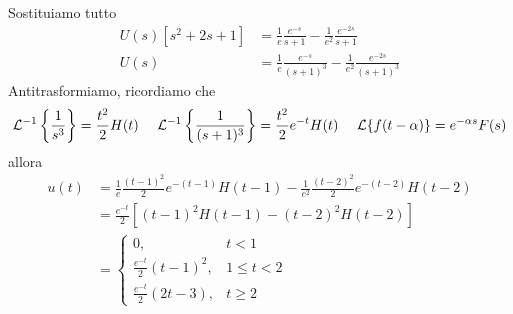 Sostituiamo tutto
\begin{equation*}
\begin{aligned}
U( s)\left[ s^{2} +2s+1\right] & =\frac{1}{e}\frac{e^{-s}}{s+1} -\frac{1}{e^{2}}\frac{e^{-2s}}{s+1}\\
U( s) & =\frac{1}{e}\frac{e^{-s}}{( s+1)^{3}} -\frac{1}{e^{2}}\frac{e^{-2s}}{( s+1)^{3}}
\end{aligned}
\end{equation*}
Antitrasformiamo, ricordiamo che
\begin{equation*}
\mathcal{L}^{-1}\left\{\frac{1}{s^{3}}\right\} =\frac{t^{2}}{2} H( t) \ \ \ \ \mathcal{L}^{-1}\left\{\frac{1}{( s+1)^{3}}\right\} =\frac{t^{2}}{2} e^{-t} H( t) \ \ \ \ \mathcal{L}\{f( t-\alpha )\} =e^{-\alpha s} F( s)
\end{equation*}
allora
\begin{align*}
u( t) & =\frac{1}{e}\frac{( t-1)^{2}}{2} e^{-( t-1)} H( t-1) -\frac{1}{e^{2}}\frac{( t-2)^{2}}{2} e^{-( t-2)} H( t-2)\\
 & =\frac{e^{-t}}{2}\left[( t-1)^{2} H( t-1) -( t-2)^{2} H( t-2)\right]\\
 & =\begin{cases}
0, & t< 1\\
\frac{e^{-t}}{2}( t-1)^{2} , & 1\leqslant t< 2\\
\frac{e^{-t}}{2}( 2t-3) , & t\geqslant 2
\end{cases}
\end{align*}
\Soluzione

